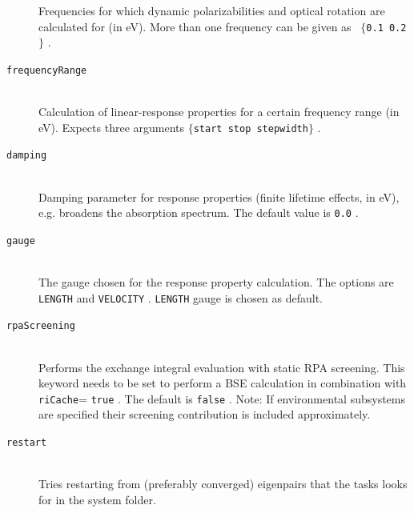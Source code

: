 \documentclass[bibliography=totocnumbered,a4paper,10pt,oneside]{scrbook}
\newcommand{\ttt}[1]{%
  \begingroup\setlength{\fboxsep}{1pt}%
  \colorbox{serenity-green!30}{\texttt{\hspace*{2pt}\vphantom{(g}#1\hspace*{2pt}}}%
  \endgroup
}
\begin{document}
\begin{description}
    Frequencies for which dynamic polarizabilities and optical rotation are calculated for (in eV). More than one frequency can be given as~\ttt{$\{$0.1 0.2$\}$}.
    \item [\texttt{frequencyRange}]\hfill \\
    Calculation of linear-response properties for a certain frequency range (in eV). Expects three arguments \ttt{$\{$start stop stepwidth$\}$}.
    \item [\texttt{damping}]\hfill \\
    Damping parameter for response properties (finite lifetime effects, in eV), e.g. broadens the absorption spectrum. The default value is \ttt{0.0}.
    \item [\texttt{gauge}]\hfill \\
    The gauge chosen for the response property calculation. The options are \ttt{LENGTH} and \ttt{VELOCITY}. \ttt{LENGTH} gauge is chosen as default.
    \item [\texttt{rpaScreening}]\hfill \\
    Performs the exchange integral evaluation with static RPA screening. This keyword needs to be set to perform a BSE calculation in combination with \texttt{riCache}=\ttt{true}. The default is \ttt{false}. Note: If environmental subsystems are specified their screening contribution is included approximately. 
    \item [\texttt{restart}]\hfill \\
    Tries restarting from (preferably converged) eigenpairs that the tasks
    looks for in the system folder.
\end{description}
\end{document}
